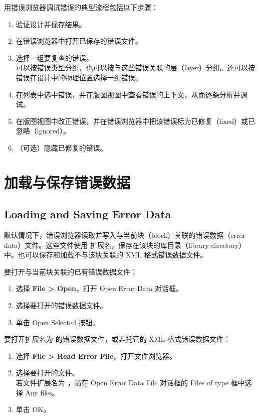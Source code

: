 用错误浏览器调试错误的典型流程包括以下步骤：
\begin{enumerate}
  \item 验证设计并保存结果。
  \item 在错误浏览器中打开已保存的错误文件。
  \item 选择一组要复查的错误。\\
        可以按错误类型分组，也可以按与这些错误关联的层（layer）分组。还可以按错误在设计中的物理位置选择一组错误。
  \item 在列表中选中错误，并在版图视图中查看错误的上下文，从而逐条分析并调试。
  \item 在版图视图中改正错误，并在错误浏览器中把该错误标为已修复（fixed）或已忽略（ignored）。
  \item （可选）隐藏已修复的错误。
\end{enumerate}

\section{加载与保存错误数据}
\subsection*{Loading and Saving Error Data}

默认情况下，错误浏览器读取并写入与当前块（block）关联的错误数据（error data）文件。这些文件使用  扩展名，保存在该块的库目录（library directory）中。也可以保存和加载不与该块关联的 XML 格式错误数据文件。

要打开与当前块关联的已有错误数据文件：
\begin{enumerate}
  \item 选择 \textbf{File > Open}，打开 Open Error Data 对话框。
  \item 选择要打开的错误数据文件。
  \item 单击 Open Selected 按钮。
\end{enumerate}

要打开扩展名为  的错误数据文件，或非托管的 XML 格式错误数据文件：
\begin{enumerate}
  \item 选择 \textbf{File > Read Error File}，打开文件浏览器。
  \item 选择要打开的文件。\\
        若文件扩展名为 ，请在 Open Error Data File 对话框的 Files of type 框中选择 Any files。
  \item 单击 OK。
\end{enumerate}

